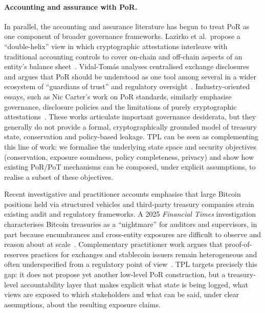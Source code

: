 \documentclass[11pt]{article}
\begin{document}
\paragraph{Accounting and assurance with PoR.}
In parallel, the accounting and assurance literature has begun to treat PoR as one component of broader governance frameworks.
Lazirko et al.\ propose a ``double-helix'' view in which cryptographic attestations interleave with traditional accounting controls to cover on-chain and off-chain aspects of an entity's balance sheet~\cite{Lazirko2025}.
Vidal-Tom\'as analyses centralised exchange disclosures and argues that PoR should be understood as one tool among several in a wider ecosystem of ``guardians of trust'' and regulatory oversight~\cite{VidalTomas2024}.
Industry-oriented essays, such as Nic Carter's work on PoR standards, similarly emphasise governance, disclosure policies and the limitations of purely cryptographic attestations~\cite{CarterPoR}.
These works articulate important governance desiderata, but they generally do not provide a formal, cryptographically grounded model of treasury state, conservation and policy-based leakage.
TPL can be seen as complementing this line of work: we formalise the underlying state space and security objectives (conservation, exposure soundness, policy completeness, privacy) and show how existing PoR/PoT mechanisms can be composed, under explicit assumptions, to realise a subset of these objectives.

Recent investigative and practitioner accounts emphasise that large Bitcoin positions held via structured vehicles and third-party treasury companies strain existing audit and regulatory frameworks.
A 2025 \emph{Financial Times} investigation characterises Bitcoin treasuries as a ``nightmare'' for auditors and supervisors, in part because encumbrances and cross-entity exposures are difficult to observe and reason about at scale~\cite{FTTreasureNightmare}.
Complementary practitioner work argues that proof-of-reserves practices for exchanges and stablecoin issuers remain heterogeneous and often underspecified from a regulatory point of view~\cite{BitcoinReserveAct,TaxbitStateReserves,Ward2025,Nau2025}.
TPL targets precisely this gap: it does not propose yet another low-level PoR construction, but a treasury-level accountability layer that makes explicit what state is being logged, what views are exposed to which stakeholders and what can be said, under clear assumptions, about the resulting exposure claims.
\end{document}
